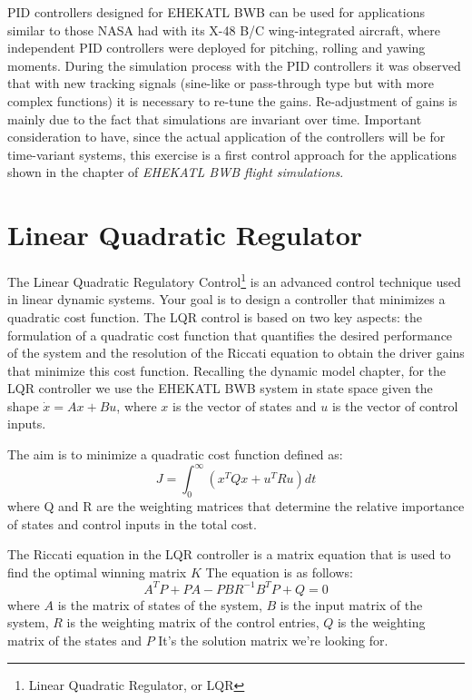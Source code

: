 PID controllers designed for EHEKATL BWB can be used for applications similar to those NASA had with its X-48 B/C wing-integrated aircraft, where independent PID controllers were deployed for pitching, rolling and yawing moments.
%
During the simulation process with the PID controllers it was observed that with new tracking signals (sine-like or pass-through type but with more complex functions) it is necessary to re-tune the gains. Re-adjustment of gains is mainly due to the fact that simulations are invariant over time. Important consideration to have, since the actual application of the controllers will be for time-variant systems, this exercise is a first control approach for the applications shown in the chapter of \textit{EHEKATL BWB flight simulations}.  



\section{Linear Quadratic Regulator}

The Linear Quadratic Regulatory Control\footnote{Linear Quadratic Regulator, or LQR} is an advanced control technique used in linear dynamic systems. 
%
Your goal is to design a controller that minimizes a quadratic cost function.
%
The LQR control is based on two key aspects: the formulation of a quadratic cost function that quantifies the desired performance of the system and the resolution of the Riccati equation to obtain the driver gains that minimize this cost function. 
%
Recalling the dynamic model chapter, for the LQR controller we use the EHEKATL BWB system in state space given the shape $\dot x = Ax + Bu$, where $x$ is the vector of states and $u$ is the vector of control inputs. 

The aim is to minimize a quadratic cost function defined as:
\begin{equation}
    J = \int_0^{\infty} (x^T Qx + u^T Ru) dt
\end{equation}
where Q and R are the weighting matrices that determine the relative importance of states and control inputs in the total cost.

The Riccati equation in the LQR controller is a matrix equation that is used to find the optimal winning matrix $K$ The equation is as follows:
\begin{equation}
    A^T P + P A - P B R^{-1} B^T P + Q = 0
\end{equation}
where $A$ is the matrix of states of the system, $B$ is the input matrix of the system, $R$ is the weighting matrix of the control entries, $Q$ is the weighting matrix of the states and $P$ It's the solution matrix we're looking for. 

